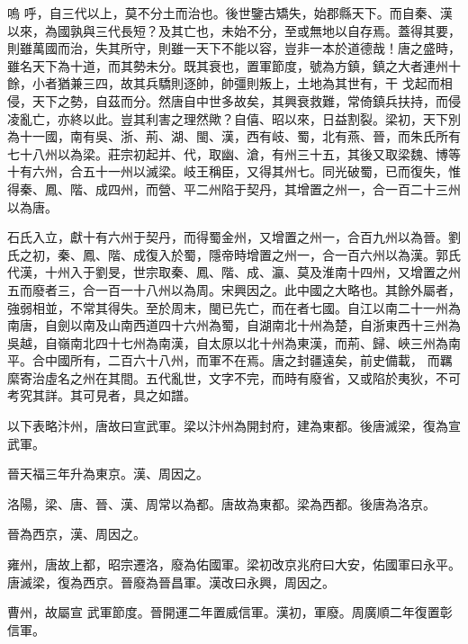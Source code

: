 
\begin{pinyinscope}

 嗚
 呼，自三代以上，莫不分土而治也。後世鑒古矯失，始郡縣天下。而自秦、漢以來，為國孰與三代長短？及其亡也，未始不分，至或無地以自存焉。蓋得其要，則雖萬國而治，失其所守，則雖一天下不能以容，豈非一本於道德哉！唐之盛時，雖名天下為十道，而其勢未分。既其衰也，置軍節度，號為方鎮，鎮之大者連州十餘，小者猶兼三四，故其兵驕則逐帥，帥彊則叛上，土地為其世有，干
 戈起而相侵，天下之勢，自茲而分。然唐自中世多故矣，其興衰救難，常倚鎮兵扶持，而侵凌亂亡，亦終以此。豈其利害之理然歟？自僖、昭以來，日益割裂。梁初，天下別為十一國，南有吳、浙、荊、湖、閩、漢，西有岐、蜀，北有燕、晉，而朱氏所有七十八州以為梁。莊宗初起并、代，取幽、滄，有州三十五，其後又取梁魏、博等十有六州，合五十一州以滅梁。岐王稱臣，又得其州七。同光破蜀，已而復失，惟得秦、鳳、階、成四州，而營、平二州陷于契丹，其增置之州一，合一百二十三州以為唐。



 石氏入立，獻十有六州于契丹，而得蜀金州，又增置之州一，合百九州以為晉。劉
 氏之初，秦、鳳、階、成復入於蜀，隱帝時增置之州一，合一百六州以為漢。郭氏代漢，十州入于劉旻，世宗取秦、鳳、階、成、瀛、莫及淮南十四州，又增置之州五而廢者三，合一百一十八州以為周。宋興因之。此中國之大略也。其餘外屬者，強弱相並，不常其得失。至於周末，閩已先亡，而在者七國。自江以南二十一州為南唐，自劍以南及山南西道四十六州為蜀，自湖南北十州為楚，自浙東西十三州為吳越，自嶺南北四十七州為南漢，自太原以北十州為東漢，而荊、歸、峽三州為南平。合中國所有，二百六十八州，而軍不在焉。唐之封疆遠矣，前史備載，
 而羈縻寄治虛名之州在其間。五代亂世，文字不完，而時有廢省，又或陷於夷狄，不可考究其詳。其可見者，具之如譜。



 以下表略汴州，唐故曰宣武軍。梁以汴州為開封府，建為東都。後唐滅梁，復為宣武軍。



 晉天福三年升為東京。漢、周因之。



 洛陽，梁、唐、晉、漢、周常以為都。唐故為東都。梁為西都。後唐為洛京。



 晉為西京，漢、周因之。



 雍州，唐故上都，昭宗遷洛，廢為佑國軍。梁初改京兆府曰大安，佑國軍曰永平。唐滅梁，復為西京。晉廢為晉昌軍。漢改曰永興，周因之。



 曹州，故屬宣
 武軍節度。晉開運二年置威信軍。漢初，軍廢。周廣順二年復置彰信軍。




\end{pinyinscope}
